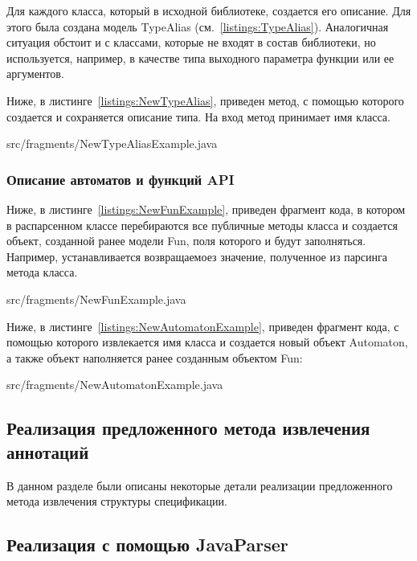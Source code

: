 Для каждого класса, который в исходной библиотеке, создается его описание. Для этого была создана модель TypeAlias (см.~\ref{listings:TypeAlias}).
Аналогичная ситуация обстоит и с классами, которые не входят в состав библиотеки, но используется, например, в качестве типа выходного параметра функции или ее аргументов.

Ниже, в листинге~\ref{listings:NewTypeAlias}, приведен метод, с помощью которого создается и сохраняется описание типа. На вход метод принимает имя класса.

{src/fragments/NewTypeAliasExample.java}

\subsubsection{Описание автоматов и функций API}

Ниже, в листинге~\ref{listings:NewFunExample}, приведен фрагмент кода, в котором в распарсенном классе перебираются все публичные методы класса и создается объект, созданной ранее модели Fun, поля которого и будут заполняться.
Например, устанавливается возвращаемоез значение, полученное из парсинга метода класса.

{src/fragments/NewFunExample.java}

Ниже, в листинге~\ref{listings:NewAutomatonExample}, приведен фрагмент кода, с помощью которого извлекается имя класса и создается новый объект Automaton, а также объект наполняется ранее созданным объектом Fun:
\newpage

{src/fragments/NewAutomatonExample.java}

\subsection{Реализация предложенного метода извлечения аннотаций}

В данном разделе были описаны некоторые детали реализации предложенного метода извлечения структуры спецификации.

\subsection{Реализация с помощью JavaParser}

